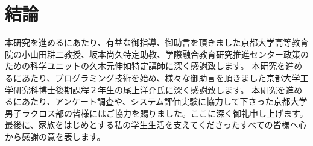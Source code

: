 \documentclass[sotsuron]{kuee}
\begin{document}
\chapter{結論}


\begin{acknowledgements}
	本研究を進めるにあたり、有益な御指導、御助言を頂きました京都大学高等教育院の小山田耕二教授、坂本尚久特定助教、学際融合教育研究推進センター政策のための科学ユニットの久木元伸如特定講師に深く感謝致します。
	本研究を進めるにあたり、プログラミング技術を始め、様々な御助言を頂きました京都大学工学研究科博士後期課程２年生の尾上洋介氏に深く感謝致します。
	本研究を進めるにあたり、アンケート調査や、システム評価実験に協力して下さった京都大学男子ラクロス部の皆様にはご協力を賜りました。ここに深く御礼申し上げます。
	最後に、家族をはじめとする私の学生生活を支えてくださったすべての皆様へ心から感謝の意を表します。
\end{acknowledgements}








\appendix

\end{document}
